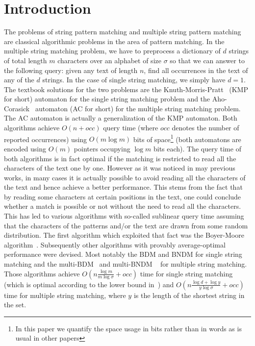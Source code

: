 \documentclass{article}
\newcommand{\?}{\mskip1.5mu}
\begin{document}
\section{Introduction}
The problems of string pattern matching and multiple string pattern matching are classical algorithmic problems in the area of pattern matching. In the multiple string matching problem, we have to preprocess a dictionary of $d$ strings of total length $m$ characters over an alphabet of size $\sigma$ so that we can answer to the following query: given any text of length $n$, find all occurrences in the text of any of the $d$ strings. In the case of single string matching, we simply have $d=1$.
\\The textbook solutions for the two problems are the Knuth-Morris-Pratt~\cite{KMP77} (KMP for short) automaton for the single string matching problem and the Aho-Corasick~\cite{AC75} automaton (AC for short) for the multiple string matching problem. The AC automaton is actually a generalization of the KMP automaton. 
Both algorithms achieve $O(n+occ)$ query time (where $occ$ denotes the number of reported occurrences) using $O(m\log m)$ bits of space\footnote{In this paper we quantify the space usage in bits rather than in words as is usual in other papers} (both automatons are encoded using $O(m)$ pointers occupying $\log m$ bits each). The query time of both algorithms is in fact optimal if the matching is restricted to read all the characters of the text one by one. However as it was noticed in may previous works, in many cases it is actually possible to avoid reading all the characters of the text and hence achieve a better performance. This stems from the fact that by reading some characters at certain positions in the text, one could conclude whether a match is possible or not without the need to read all the characters. This has led to various algorithms with so-called sublinear query time assuming that the characters of the patterns and/or the text are drawn from some random distribution. 
The first algorithm which exploited that fact was the Boyer-Moore algorithm~\cite{BM77}. Subsequently other algorithms with provably average-optimal performance were devised. Most  notably the BDM and BNDM for single string matching and the multi-BDM~\cite{CR94,CCGJLPR94} and multi-BNDM ~\cite{NR98} for multiple string matching. Those algorithms achieve $O(n\frac{\log m}{m\log\sigma}+occ)$ time for single string matching (which is optimal according to the lower bound in~\cite{YAO79}) and $O(n\frac{\log d+\log y}{y\log\sigma}+occ)$ time for multiple string matching, where $y$ is the length of the shortest string in the set. 
\end{document}
